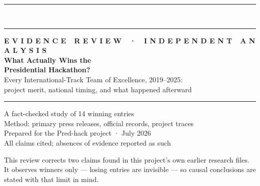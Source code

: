 \documentclass[11pt,a4paper]{article}
\begin{document}
\begin{titlepage}
\noindent
\begin{minipage}{\textwidth}
{\color{ink}\rule{\textwidth}{14mm}}\\[-2.5pt]
{\color{steel}\rule{\textwidth}{2.6mm}}
\end{minipage}
\vspace{2.8cm}

\begin{minipage}{0.85\textwidth}
\hspace{1.9cm}\begin{minipage}{0.88\textwidth}
{\sffamily\footnotesize\bfseries\color{steel}\MakeUppercase{E v i d e n c e\ \ R e v i e w\ \ ·\ \ I n d e p e n d e n t\ \ A n a l y s i s}}\\[9mm]
{\fontsize{26}{31}\selectfont\bfseries\color{ink}What Actually Wins the\\Presidential Hackathon?}\\[7mm]
{\large\color{ink!75}Every International-Track Team of Excellence, 2019--2025:\\project merit, national timing, and what happened afterward}\\[14mm]
{\color{ink}\rule{2.6pt}{2.4cm}}\hspace{4mm}%
\begin{minipage}[b]{0.8\textwidth}\small
A fact-checked study of 14 winning entries\\
Method: primary press releases, official records, project traces\\
Prepared for the Pred-hack project · July 2026\\
All claims cited; absences of evidence reported as such
\end{minipage}
\end{minipage}
\end{minipage}
\vfill
\noindent
\begin{minipage}{\textwidth}
\hspace{1.9cm}\begin{minipage}{0.52\textwidth}
\footnotesize\color{black!55}
This review corrects two claims found in this project's own earlier research
files. It observes winners only --- losing entries are invisible --- so causal
conclusions are stated with that limit in mind.
\end{minipage}
\hfill
\raisebox{-0.4cm}{{\color{mist}\rule{3cm}{3cm}}}\hspace{-3cm}\raisebox{-3.42cm}{{\color{ink}\rule{6.2cm}{3cm}}}
\end{minipage}
\restoregeometry
\end{titlepage}

\thispagestyle{plain}
\tableofcontents
\clearpage





\end{document}
